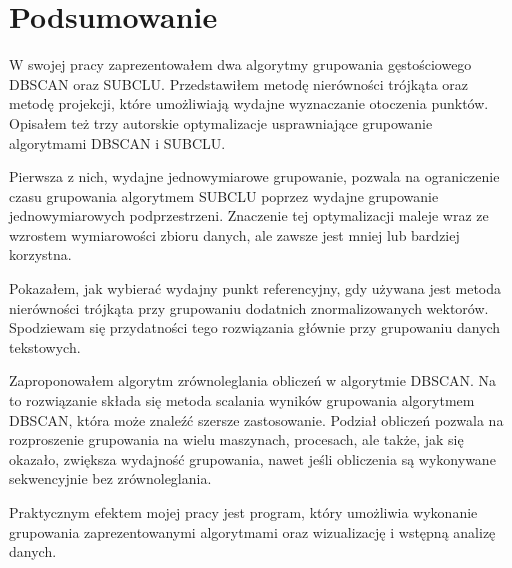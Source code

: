 \chapter{Podsumowanie}
W swojej pracy zaprezentowałem dwa algorytmy grupowania gęstościowego DBSCAN oraz SUBCLU. Przedstawiłem metodę nierówności trójkąta oraz metodę projekcji, które umożliwiają wydajne wyznaczanie otoczenia punktów. Opisałem też trzy autorskie optymalizacje usprawniające grupowanie algorytmami DBSCAN i SUBCLU. 

Pierwsza z nich, wydajne jednowymiarowe grupowanie, pozwala na ograniczenie czasu grupowania algorytmem SUBCLU poprzez wydajne grupowanie jednowymiarowych podprzestrzeni. Znaczenie tej optymalizacji maleje wraz ze wzrostem wymiarowości zbioru danych, ale zawsze jest mniej lub bardziej korzystna.

Pokazałem, jak wybierać wydajny punkt referencyjny, gdy używana jest metoda nierówności trójkąta przy grupowaniu dodatnich znormalizowanych wektorów. Spodziewam się przydatności tego rozwiązania głównie przy grupowaniu danych tekstowych.

Zaproponowałem algorytm zrównoleglania obliczeń w algorytmie DBSCAN. Na to rozwiązanie składa się metoda scalania wyników grupowania algorytmem DBSCAN, która może znaleźć szersze zastosowanie. Podział obliczeń pozwala na rozproszenie grupowania na wielu maszynach, procesach, ale także, jak się okazało, zwiększa wydajność grupowania, nawet jeśli obliczenia są wykonywane sekwencyjnie bez zrównoleglania.

Praktycznym efektem mojej pracy jest program, który umożliwia wykonanie grupowania zaprezentowanymi algorytmami oraz wizualizację i wstępną analizę danych.